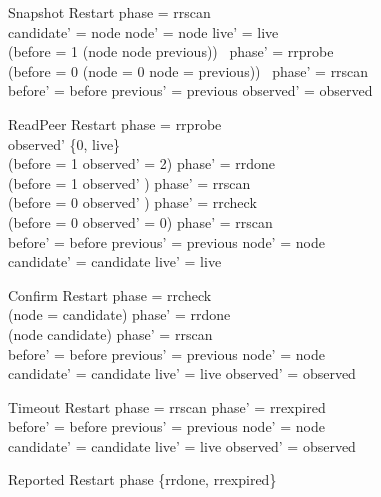 \documentclass[a4paper,10pt]{article}
\begin{document}
\begin{schema}{Snapshot}
\Delta Restart
\where
phase = rrscan \\
candidate' = node \land node' = node \land live' = live \\
(before = 1 \lor (node  \land node \neq previous))
\quad~\implies phase' = rrprobe \\
(before = 0 \land (node = 0 \lor node = previous))
\quad~\implies phase' = rrscan \\
before' = before \land previous' = previous \land observed' = observed
\end{schema}

\begin{schema}{ReadPeer}
\Delta Restart
\where
phase = rrprobe \\
observed' \in \{0, live\} \\
(before = 1 \land observed' = 2) \implies phase' = rrdone \\
(before = 1 \land observed' ) \implies phase' = rrscan \\
(before = 0 \land observed' ) \implies phase' = rrcheck \\
(before = 0 \land observed' = 0) \implies phase' = rrscan \\
before' = before \land previous' = previous \land node' = node \\
candidate' = candidate \land live' = live
\end{schema}

\begin{schema}{Confirm}
\Delta Restart
\where
phase = rrcheck \\
(node = candidate) \implies phase' = rrdone \\
(node \neq candidate) \implies phase' = rrscan \\
before' = before \land previous' = previous \land node' = node \\
candidate' = candidate \land live' = live \land observed' = observed
\end{schema}

\begin{schema}{Timeout}
\Delta Restart
\where
phase = rrscan \land phase' = rrexpired \\
before' = before \land previous' = previous \land node' = node \\
candidate' = candidate \land live' = live \land observed' = observed
\end{schema}

\begin{schema}{Reported}
\Xi Restart
\where
phase \in \{rrdone, rrexpired\}
\end{schema}
\end{document}
